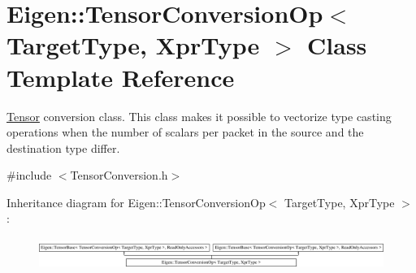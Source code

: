 \hypertarget{class_eigen_1_1_tensor_conversion_op}{}\section{Eigen\+:\+:Tensor\+Conversion\+Op$<$ Target\+Type, Xpr\+Type $>$ Class Template Reference}
\label{class_eigen_1_1_tensor_conversion_op}


\hyperlink{class_eigen_1_1_tensor}{Tensor} conversion class. This class makes it possible to vectorize type casting operations when the number of scalars per packet in the source and the destination type differ.  




{\ttfamily \#include $<$Tensor\+Conversion.\+h$>$}

Inheritance diagram for Eigen\+:\+:Tensor\+Conversion\+Op$<$ Target\+Type, Xpr\+Type $>$\+:\begin{figure}[H]
\begin{center}
\leavevmode
\includegraphics[height=1.035120cm]{class_eigen_1_1_tensor_conversion_op}
\end{center}
\end{figure}
